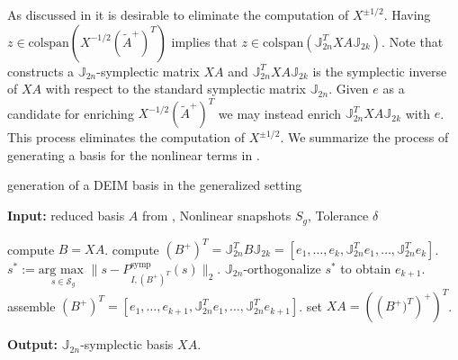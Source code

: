 As discussed in  it is desirable to eliminate the computation of $X^{\pm 1/2}$. Having $z \in \text{colspan}\left(X^{-1/2} (\tilde A^+)^T\right)$ implies that $z \in \text{colspan}(\mathbb J_{2n}^T X A \mathbb J_{2k})$. Note that  constructs a $\mathbb J_{2n}$-symplectic matrix $XA$ and $\mathbb J_{2n}^T X A \mathbb J_{2k}$ is the symplectic inverse of $XA$ with respect to the standard symplectic matrix $\mathbb J_{2n}$. Given $e$ as a candidate for enriching $X^{-1/2} (\tilde A^+)^T$ we may instead enrich $\mathbb J_{2n}^T X A \mathbb J_{2k}$ with $e$. This process eliminates the computation of $X^{\pm 1/2}$. We summarize the process of generating a basis for the nonlinear terms in .



\begin{algorithm} 
	\caption{generation of a DEIM basis in the generalized setting} \label{alg:5.2}
	\textbf{Input:} reduced basis $A$ from , Nonlinear snapshots $S_g$, Tolerance $\delta$
	\begin{algorithmic} [1]
		\State compute $B=XA$.
		\State compute $(B^+)^T = \mathbb J_{2n}^T B \mathbb J_{2k} = [e_1,\dots ,e_{k} , \mathbb J_{2n}^Te_1,\dots, \mathbb J_{2n}^Te_{k}]$.
			\State $s^* := \underset{s\in \mathcal S_g}{\text{arg\ max }} \| s - P_{I,(B^+)^T}^{\text{symp}} (s)  \|_2$.
			\State $\mathbb J_{2n}$-orthogonalize $s^*$ to obtain $e_{k+1}$.
			\State assemble $(B^+)^T = [e_1,\dots ,e_{k+1} , \mathbb J_{2n}^Te_1,\dots, \mathbb J_{2n}^Te_{k+1}]$.
		\EndWhile
		\State set $XA = \left( \left (B^+)^T \right)^+ \right)^T$.
	\end{algorithmic}
	\vspace{0.5cm}
	\textbf{Output:} $\mathbb J_{2n}$-symplectic basis $XA$.
\end{algorithm}










